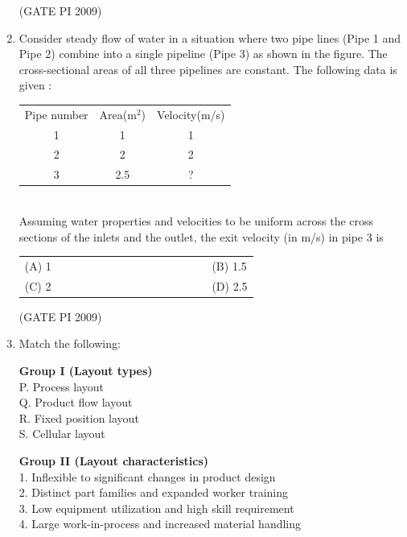 \documentclass[journal,12pt,onecolumn]{IEEEtran}
\theoremstyle{remark}
\begin{document}
\begin{enumerate}[label=Q.\arabic*, leftmargin=*]
\hfill (GATE PI 2009)
\item Consider steady flow of water in a situation where two pipe lines (Pipe 1 and Pipe 2) combine into a single pipeline (Pipe 3) as shown in the figure. The cross-sectional areas of all three pipelines are constant. The following data is given : \\
\begin{tabular}{c c c}
Pipe number & Area(m$^2$) & Velocity(m/s) \\
   1  & 1 & 1 \\
   2  & 2 & 2\\
   3 & 2.5 & ? \\
   \end{tabular} \\
Assuming water properties and velocities to be uniform across the cross sections of the inlets and the outlet, the exit velocity (in m/s) in pipe 3 is
\begin{multicols}{2}
\begin{tabular}[t]{p{0.8\linewidth} p{0.9\linewidth}}
(A) 1 & (B) 1.5 \\
(C) 2 & (D) 2.5 \\
\end{tabular}
\end{multicols}
\hfill (GATE PI 2009)
\item Match the following: \\
\noindent
\begin{minipage}[t]{0.45\textwidth}
\textbf{Group I (Layout types)}\\[0.5em]
P. Process layout \\
Q. Product flow layout \\
R. Fixed position layout \\
S. Cellular layout
\end{minipage}
\hfill
\begin{minipage}[t]{0.9\textwidth}
\textbf{Group II (Layout characteristics)}\\[0.5em]
1. Inflexible to significant changes in product design \\
2. Distinct part families and expanded worker training \\
3. Low equipment utilization and high skill requirement \\
4. Large work-in-process and increased material handling
\end{minipage}



\end{enumerate}
\end{document}
